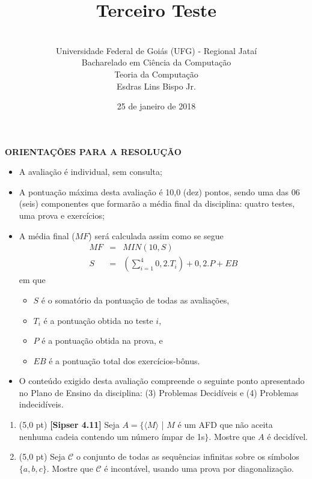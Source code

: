 \documentclass[12pt,a4paper,oneside]{article}
\author{\\Universidade Federal de Goiás (UFG) - Regional  Jataí\\Bacharelado em Ciência da Computação \\Teoria da Computação \\Esdras Lins Bispo Jr.}
\date{25 de janeiro de 2018}
\title{\sc \huge Terceiro Teste}
\begin{document}
\maketitle

{\bf ORIENTAÇÕES PARA A RESOLUÇÃO}

\small
 
\begin{itemize}
	\item A avaliação é individual, sem consulta;
	\item A pontuação máxima desta avaliação é 10,0 (dez) pontos, sendo uma das 06 (seis) componentes que formarão a média final da disciplina: quatro testes, uma prova e exercícios;
	\item A média final ($MF$) será calculada assim como se segue
	\begin{eqnarray}
		MF & = & MIN(10, S) \nonumber \\
		S & = & (\sum_{i=1}^{4} 0,2.T_i ) + 0,2.P  + EB\nonumber
	\end{eqnarray}
	em que 
	\begin{itemize}
		\item $S$ é o somatório da pontuação de todas as avaliações,
		\item $T_i$ é a pontuação obtida no teste $i$,
		\item $P$ é a pontuação obtida na prova, e
		\item $EB$ é a pontuação total dos exercícios-bônus.
	\end{itemize}
	\item O conteúdo exigido desta avaliação compreende o seguinte ponto apresentado no Plano de Ensino da disciplina: (3) Problemas Decidíveis e (4) Problemas indecidíveis.
\end{itemize}

\begin{center}
\end{center}

\newpage

\begin{enumerate}
	
	\section*{Terceiro Teste}
	
	\item (5,0 pt)  {\bf [Sipser 4.11]}  Seja $A = \{ \langle M \rangle$ | $M$ é um AFD que não aceita nenhuma cadeia contendo um número ímpar de 1s$\}$. Mostre que $A$ é decidível.

	\item (5,0 pt) Seja $\mathcal{C}$ o conjunto de todas as sequências infinitas sobre os símbolos $\{a, b, c\}$. Mostre que $\mathcal{C}$ é incontável, usando uma prova por diagonalização.	

\end{enumerate}
\end{document}
